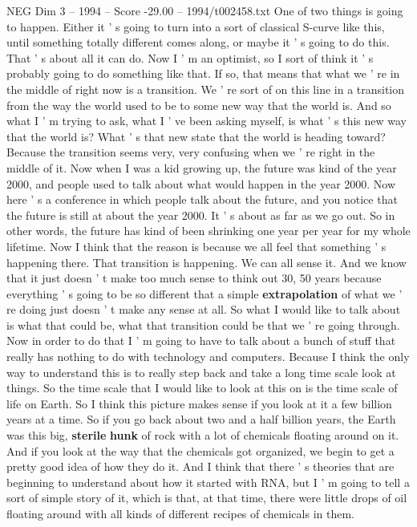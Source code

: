 \begin{textsample}{NEG Dim 3 – 1994 – Score -29.00 – 1994/t002458.txt}
One of two things is going to happen.
Either it ' s going to turn into a sort of classical S-curve like this, until something totally different comes along, or maybe it ' s going to do this.
That ' s about all it can do.
Now I ' m an optimist, so I sort of think it ' s probably going to do something like that.
If so, that means that what we ' re in the middle of right now is a transition.
We ' re sort of on this line in a transition from the way the world used to be to some new way that the world is.
And so what I ' m trying to ask, what I ' ve been asking myself, is what ' s this new way that the world is?
What ' s that new state that the world is heading toward?
Because the transition seems very, very confusing when we ' re right in the middle of it.
Now when I was a kid growing up, the future was kind of the year 2000, and people used to talk about what would happen in the year 2000.
Now here ' s a conference in which people talk about the future, and you notice that the future is still at about the year 2000.
It ' s about as far as we go out.
So in other words, the future has kind of been shrinking one year per year for my whole lifetime.
Now I think that the reason is because we all feel that something ' s happening there.
That transition is happening.
We can all sense it.
And we know that it just doesn ' t make too much sense to think out 30, 50 years because everything ' s going to be so different that a simple \textbf{extrapolation} of what we ' re doing just doesn ' t make any sense at all.
So what I would like to talk about is what that could be, what that transition could be that we ' re going through.
Now in order to do that I ' m going to have to talk about a bunch of stuff that really has nothing to do with technology and computers.
Because I think the only way to understand this is to really step back and take a long time scale look at things.
So the time scale that I would like to look at this on is the time scale of life on Earth.
So I think this picture makes sense if you look at it a few billion years at a time.
So if you go back about two and a half billion years, the Earth was this big, \textbf{sterile} \textbf{hunk} of rock with a lot of chemicals floating around on it.
And if you look at the way that the chemicals got organized, we begin to get a pretty good idea of how they do it.
And I think that there ' s theories that are beginning to understand about how it started with RNA, but I ' m going to tell a sort of simple story of it, which is that, at that time, there were little drops of oil floating around with all kinds of different recipes of chemicals in them.

\end{textsample}
